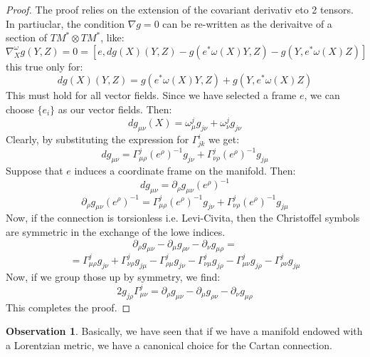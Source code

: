 \documentclass[12pt,a4paper]{report}
\theoremstyle{definition}
\theoremstyle{Theorem}
\theoremstyle{break}
\theoremstyle{definition}
\newtheorem{Obs}[Def]{Observation}
\begin{document}
		\begin{proof}
			The proof relies on the extension of the covariant derivativ eto 2 tensors. In partiuclar, the condition $\nabla g=0$ can be re-written as the derivaitve of a section of $TM^*\otimes TM^*$, like:
			$$\nabla_X^\omega g(Y,Z)=0=[e,dg(X)(Y,Z)-g(e^*\omega(X)Y,Z)-g(Y,e^*\omega(X)Z)]$$
			this true only for:
			$$dg(X)(Y,Z)=g(e^*\omega(X)Y,Z)+g(Y,e^*\omega(X)Z)$$ 
			This must hold for all vector fields. Since we have selected a frame $e$, we can choose $\{e_i\}$ as our vector fields. Then:
			$$dg_{\mu\nu}(X)=\omega_\mu^jg_{j\nu}+\omega_\nu^jg_{j\nu}$$
			Clearly, by substituting the expression for $\Gamma^i_{jk}$ we get:
			$$dg_{\mu\nu}=\Gamma^j_{\mu\rho}(e^\rho)^{-1}g_{j\nu}+\Gamma^j_{\nu\rho}(e^\rho)^{-1}g_{j\mu}$$
			Suppose that $e$ induces a coordinate frame on the manifold. Then:
			$$dg_{\mu\nu}=\partial_\rho g_{\mu\nu}(e^\rho)^{-1}$$
			$$\partial_\rho g_{\mu\nu}(e^\rho)^{-1}=\Gamma^j_{\mu\rho}(e^\rho)^{-1}g_{j\nu}+\Gamma^j_{\nu\rho}(e^\rho)^{-1}g_{j\mu}$$
			Now, if the connection is torsionless i.e. Levi-Civita, then the Christoffel symbols are symmetric in the exchange of the lowe indices.
			$$\partial_\rho g_{\mu\nu}-\partial_\mu g_{\rho\nu}-\partial_\nu g_{\mu\rho}=$$
			$$=\Gamma^j_{\mu\rho}g_{j\nu}+\Gamma^j_{\nu\rho}g_{j\mu}-
			\Gamma^j_{\rho\mu}g_{j\nu}-\Gamma^j_{\nu\mu}g_{j\rho}-
			\Gamma^j_{\mu\nu}g_{j\rho}-\Gamma^j_{\rho\nu}g_{j\mu}$$
			Now, if we group those up by symmetry, we find:
			$$2g_{j\rho}\Gamma^j_{\mu\nu}=\partial_\rho g_{\mu\nu}-\partial_\mu g_{\rho\nu}-\partial_\nu g_{\mu\rho}$$
			This completes the proof. 
		\end{proof}
		\begin{Obs}
			Basically, we have seen that if we have a manifold endowed with a Lorentzian metric, we have a canonical choice for the Cartan connection.
		\end{Obs}
\end{document}
